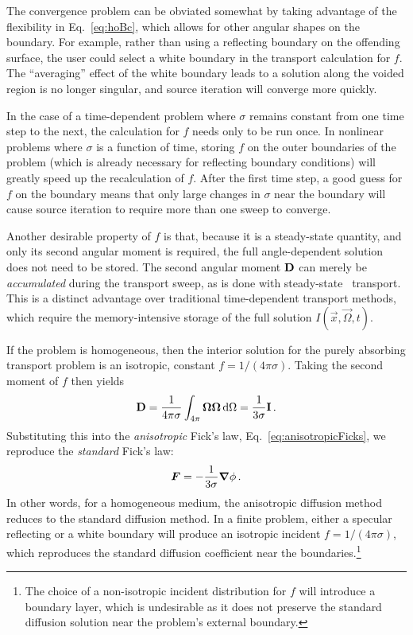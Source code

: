 The convergence problem can be obviated somewhat by taking advantage of the
flexibility in Eq.~\eqref{eq:hoBc}, which allows for other angular shapes on the
boundary. For example, rather than using a reflecting boundary on the offending
surface, the user could select a white boundary in the transport calculation for
$f$. The ``averaging'' effect of the white boundary leads to a solution along
the voided region is no longer singular, and source iteration will converge more
quickly.

In the case of a time-dependent problem where $\sigma$ remains constant from one
time step to the next, the calculation for $f$ needs only to be run once. In
nonlinear problems where $\sigma$ is a function of time, storing $f$ on the
outer boundaries of the problem (which is already necessary for reflecting
boundary conditions) will greatly speed up the recalculation of $f$. After the
first time step, a good guess for $f$ on the boundary means that only
large changes in $\sigma$ near the boundary will cause source iteration to
require more than one sweep to converge.

Another desirable property of $f$ is that, because it is a steady-state
quantity, and only its second angular moment is required, the
full angle-dependent solution does not need to be stored. The second angular
moment $\mathbf{D}$ can merely be \emph{accumulated} during the transport sweep, as
is done with steady-state
\SN\ transport. This is a distinct
advantage over traditional time-dependent transport methods, which require the
memory-intensive storage of the full solution $I(\vec{x},\vec{\Omega},t)$.

If the problem is homogeneous, then the interior solution for the purely
absorbing transport problem is an isotropic, constant $f=1/(4\pi\sigma)$.
Taking the second moment of $f$ then yields
\begin{equation*}
  \mathbf{D} = \frac{1}{4\pi\sigma} \int_{4\pi} \bm{\Omega} \bm{\Omega} \mathop{}\!\mathrm{d} \Omega
  = \frac{1}{3\sigma} \mathbf{I}\,.
\end{equation*}
Substituting this into the \emph{anisotropic} Fick's law,
Eq.~\eqref{eq:anisotropicFicks}, we reproduce the \emph{standard} Fick's law:
\begin{equation*}
  \bm{F} = - \frac{1}{3\sigma} \bm{\nabla} \phi\,.
\end{equation*}
In other words, for a homogeneous medium, the anisotropic diffusion method
reduces to the standard diffusion method. In a finite problem, either a specular
reflecting or a white boundary will produce an isotropic incident
$f=1/(4\pi\sigma)$, which reproduces the standard diffusion coefficient near the
boundaries.\footnote{%
The choice of a non-isotropic incident distribution for $f$ will introduce a
boundary layer, which is undesirable as it does not preserve the
standard diffusion solution near the problem's external boundary.}

